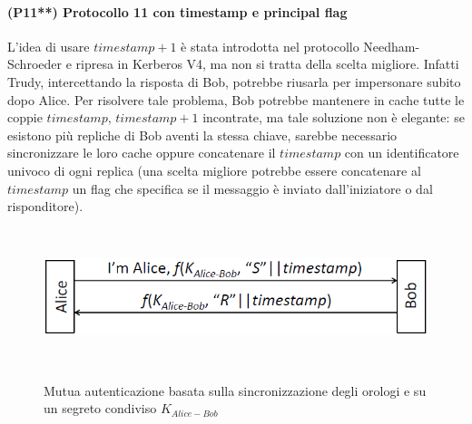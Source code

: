 \paragraph{(P11**) Protocollo 11 con timestamp e principal flag}
L'idea di usare $timestamp + 1$ è stata introdotta nel protocollo Needham-Schroeder e ripresa in Kerberos V4, ma non si tratta della scelta migliore. Infatti Trudy, intercettando la risposta di Bob, potrebbe riusarla per impersonare subito dopo Alice. Per risolvere tale problema, Bob potrebbe mantenere in cache tutte le coppie $timestamp$, $timestamp + 1$ incontrate, ma tale soluzione non è elegante: se esistono più repliche di Bob aventi la stessa chiave, sarebbe necessario sincronizzare le loro cache oppure concatenare il $timestamp$ con un identificatore univoco di ogni replica (una scelta migliore potrebbe essere concatenare al $timestamp$ un flag che specifica se il messaggio è inviato dall'iniziatore o dal risponditore).
\begin{figure}[htbp]
	\centering%
	\subfigure%
	{\includegraphics[height=4cm, width=12cm, keepaspectratio]{Immagini/autenticazione/ImgS56bis.png}}
	\caption{Mutua autenticazione basata sulla sincronizzazione degli orologi e su un segreto condiviso $K_{Alice-Bob}$}\label{fig:ImgS56bis} 	
\end{figure}

